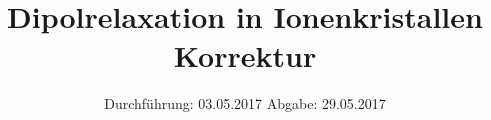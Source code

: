 

\subject{V48}
\title{Dipolrelaxation in Ionenkristallen Korrektur}
\date{
  Durchführung: 03.05.2017
  \hspace{3em}
  Abgabe: 29.05.2017
}



\maketitle
\thispagestyle{empty}
\tableofcontents
\newpage







\printbibliography


